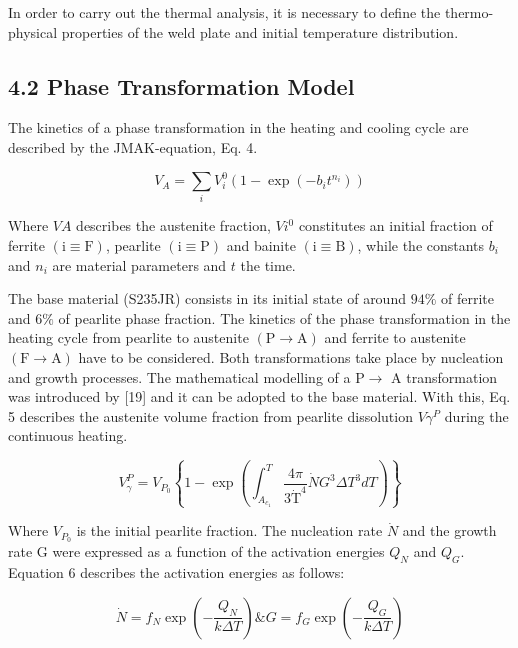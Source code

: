 \documentclass[10pt]{article}
\begin{document}
In order to carry out the thermal analysis, it is necessary to define the thermo-physical properties of the weld plate and initial temperature distribution.

\subsection*{4.2 Phase Transformation Model}
The kinetics of a phase transformation in the heating and cooling cycle are described by the JMAK-equation, Eq. 4.


\begin{equation*}
V_{A}=\sum_{i} V_{i}^{0}\left(1-\exp \left(-b_{i} t^{n_{i}}\right)\right) \tag{4}
\end{equation*}


Where $V A$ describes the austenite fraction, $V i^{0}$ constitutes an initial fraction of ferrite $(\mathrm{i} \equiv \mathrm{F})$, pearlite $(\mathrm{i} \equiv \mathrm{P})$ and bainite $(\mathrm{i} \equiv \mathrm{B})$, while the constants $b_{i}$ and $n_{i}$ are material parameters and $t$ the time.

The base material (S235JR) consists in its initial state of around $94 \%$ of ferrite and $6 \%$ of pearlite phase fraction. The kinetics of the phase transformation in the heating cycle from pearlite to austenite $(\mathrm{P} \rightarrow \mathrm{A})$ and ferrite to austenite $(\mathrm{F} \rightarrow \mathrm{A})$ have to be considered. Both transformations take place by nucleation and growth processes. The mathematical modelling of a $\mathrm{P} \rightarrow$ A transformation was introduced by [19] and it can be adopted to the base material. With this, Eq. 5 describes the austenite volume fraction from pearlite dissolution $V \gamma^{P}$ during the continuous heating.


\begin{equation*}
V_{\gamma}^{P}=V_{P_{0}}\left\{1-\exp \left(\int_{A_{c_{1}}}^{T} \frac{4 \pi}{3 \dot{\mathrm{T}}^{4}} \dot{N} G^{3} \Delta T^{3} d T\right)\right\} \tag{5}
\end{equation*}


Where $V_{P_{0}}$ is the initial pearlite fraction. The nucleation rate $\dot{N}$ and the growth rate $\mathrm{G}$ were expressed as a function of the activation energies $Q_{N}$ and $Q_{G}$. Equation 6 describes the activation energies as follows:


\begin{equation*}
\dot{N}=f_{N} \exp \left(-\frac{Q_{N}}{k \Delta T}\right) \& G=f_{G} \exp \left(-\frac{Q_{G}}{k \Delta T}\right) \tag{6}
\end{equation*}
\end{document}

